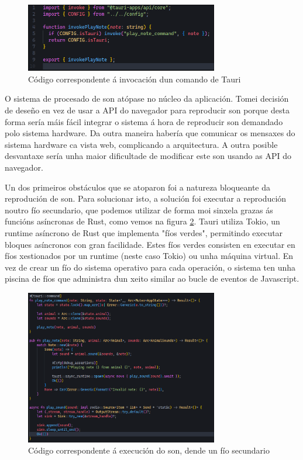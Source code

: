 \begin{figure}[hp!]
  \centering
  \includegraphics[width=0.75\textwidth]{imaxes/invokePlayNote.png}
  \caption{Código correspondente á invocación dun comando de Tauri}
  \label{fig:invokePlayNote}
\end{figure}

O sistema de procesado de son atópase no núcleo da aplicación. Tomei decisión de deseño en vez de usar a API do navegador para reproducir son porque desta forma sería máis fácil integrar o sistema á hora de reproducir son demandado polo sistema hardware. Da outra maneira habería que comunicar os mensaxes do sistema hardware ca vista web, complicando a arquitectura. A outra posible desvantaxe sería unha maior dificultade de modificar este son usando as API do navegador.

Un dos primeiros obstáculos que se atoparon foi a natureza bloqueante da reprodución de son. Para solucionar isto, a solución foi executar a reprodución noutro fío secundario, que podemos utilizar de forma moi sinxela grazas ás funcións asíncronas de Rust, como vemos na figura \ref{fig:playNoteCommand}. Tauri utiliza Tokio, un runtime asíncrono de Rust que implementa "fíos verdes", permitindo executar bloques asíncronos con gran facilidade. Estes fíos verdes\cite{GreenThread} consisten en executar en fíos xestionados por un runtime (neste caso Tokio) ou unha máquina virtual. En vez de crear un fío do sistema operativo para cada operación, o sistema ten unha piscina de fíos que administra dun xeito similar ao bucle de eventos de Javascript.

\begin{figure}[hp!]
  \centering
  \includegraphics[width=0.75\textwidth]{imaxes/playNoteCommand.png}
  \caption{Código correspondente á execución do son, dende un fío secundario}
  \label{fig:playNoteCommand}
\end{figure}

